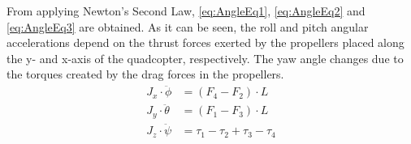 %
From applying Newton's Second Law, \autoref{eq:AngleEq1}, \ref{eq:AngleEq2} and \ref{eq:AngleEq3} are obtained. As it can be seen, the roll and pitch angular accelerations depend on the thrust forces exerted by the propellers placed along the y- and x-axis of the quadcopter, respectively. The yaw angle changes due to the torques created by the drag forces in the propellers.
%
\begin{align}
	J_x\cdot\ddot{\phi}&=(F_4-F_2)\cdot L  \label{eq:AngleEq1} \\
	J_y\cdot\ddot{\theta}&=(F_1-F_3)\cdot L  \label{eq:AngleEq2}\\
	J_z\cdot\ddot{\psi}&=\tau_1-\tau_2+\tau_3-\tau_4
	\label{eq:AngleEq3}
\end{align}
\begin{where}
\end{where}

